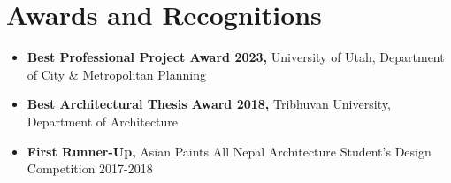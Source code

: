 \section{\faAward \textbf{ Awards and Recognitions}}
    \begin{itemize}[leftmargin=0.15in]
    	\item{\textbf{Best Professional Project Award 2023, }{University of Utah, Department of City \& Metropolitan Planning}} \\
        \item{\textbf{Best Architectural Thesis Award 2018, }{Tribhuvan University, Department of Architecture}} \\
        \item{\textbf{First Runner-Up, }{Asian Paints All Nepal Architecture Student’s Design Competition 2017-2018}}
    \end{itemize}